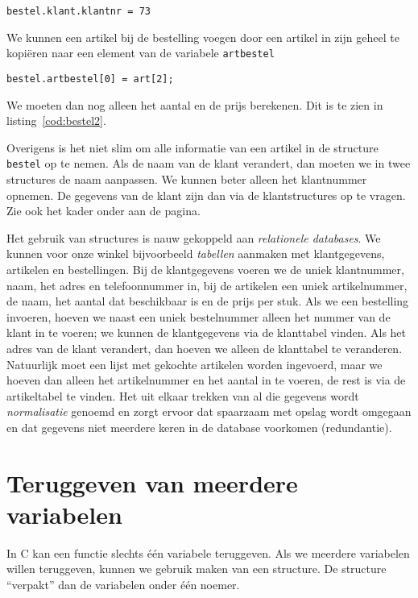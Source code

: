 \hspace*{1em}\texttt{bestel.klant.klantnr = 73}

We kunnen een artikel bij de bestelling voegen door een artikel in zijn geheel te kopiëren naar een element van de variabele \texttt{artbestel}

\hspace*{1em}\texttt{bestel.artbestel[0] = art[2];}

We moeten dan nog alleen het aantal en de prijs berekenen. Dit is te zien in listing~\ref{cod:bestel2}.


Overigens is het niet slim om alle informatie van een artikel in de structure \texttt{bestel} op te nemen. Als de naam van de klant verandert, dan moeten we in twee structures de naam aanpassen. We kunnen beter alleen het klantnummer opnemen. De gegevens van de klant zijn dan via de klantstructures op te vragen. Zie ook het kader onder aan de pagina.

\begin{infobox}
Het gebruik van structures is nauw gekoppeld aan \textsl{relationele databases}. We kunnen voor onze winkel bijvoorbeeld \textsl{tabellen} aanmaken met klantgegevens, artikelen en bestellingen. Bij de klantgegevens voeren we de uniek klantnummer, naam, het adres en telefoonnummer in, bij de artikelen een uniek artikelnummer, de naam, het aantal dat beschikbaar is en de prijs per stuk. Als we een bestelling invoeren, hoeven we naast een uniek bestelnummer alleen het nummer van de klant in te voeren; we kunnen de klantgegevens via de klanttabel vinden. Als het adres van de klant verandert, dan hoeven we alleen de klanttabel te veranderen. Natuurlijk moet een lijst met gekochte artikelen worden ingevoerd, maar we hoeven dan alleen het artikelnummer en het aantal in te voeren, de rest is via de artikeltabel te vinden. Het uit elkaar trekken van al die gegevens wordt \textsl{normalisatie} genoemd en zorgt ervoor dat spaarzaam met opslag wordt omgegaan en dat gegevens niet meerdere keren in de database voorkomen (redundantie).
\end{infobox}


\section{Teruggeven van meerdere variabelen}
In C kan een functie slechts één variabele teruggeven. Als we meerdere variabelen willen teruggeven, kunnen we gebruik maken van een structure. De structure ``verpakt'' dan de variabelen onder één noemer.

